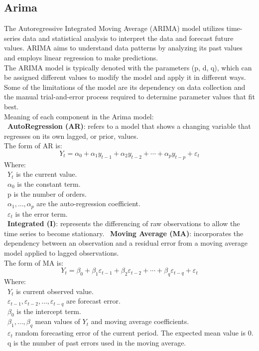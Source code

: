 \documentclass{ieeeojies}
\begin{document}
\subsection{Arima}
The Autoregressive Integrated Moving Average (ARIMA) \cite{b8} model utilizes time-series data and statistical analysis to interpret the data and forecast future values. ARIMA aims to understand data patterns by analyzing its past values and employs linear regression to make predictions.\\
The ARIMA model is typically denoted with the parameters (p, d, q), which can be assigned different values to modify the model and apply it in different ways.\\
Some of the limitations of the model are its dependency on data collection and the manual trial-and-error process required to determine parameter values that fit best. \\
Meaning of each component in the Arima model:\\
\indent \textbullet\ \textbf{AutoRegression (AR)}: refers to a model that shows a changing variable that regresses on its own lagged, or prior, values.\\
The form of AR is: 
\[Y_t=\alpha_0+\alpha_1 y_{t-1}+\alpha_2 y_{t-2}+\cdots+\alpha_p y_{t-p}+\varepsilon_t\]
Where:\\
	\indent\textbullet\ \(Y_t\) is the current value.\\
        \indent\textbullet\ \(\alpha_0\) is the constant term.\\
        \indent\textbullet\ p is the number of orders.\\
        \indent\textbullet\ \(\alpha_1,..., \alpha_p\) are the auto-regression coefficient.\\
	\indent\textbullet\ \(\varepsilon_t\) is the error term.\\

\indent \textbullet\ \textbf{Integrated (I)}: represents the differencing of raw observations to allow the time series to become stationary.
\indent \textbullet\ \textbf{Moving Average (MA)}: incorporates the dependency between an observation and a residual error from a moving average model applied to lagged observations.\\
The form of MA is:
\[Y_t=\beta_0+\beta_1 \varepsilon_{t-1}+\beta_2 \varepsilon_{t-2}+\cdots+\beta_q \varepsilon_{t-q}+\varepsilon_t\]
Where:\\
        \indent\textbullet\ \(Y_t\) is current observed value.\\
	\indent\textbullet\ \(\varepsilon_{t-1}, \varepsilon_{t-2}, \ldots, \varepsilon_{t-q}\) are forecast error.\\
	\indent\textbullet\ \(\beta_0\) is the intercept term.\\
	\indent\textbullet\ \(\beta_1,..., \beta_q\) mean values of \(Y_t\) and moving average coefficients.\\
	\indent\textbullet\ \(\varepsilon_{t}\) random forecasting error of the current period. The expected mean value is 0.\\
        \indent\textbullet\ q is the number of past errors used in the moving average.
\end{document}
